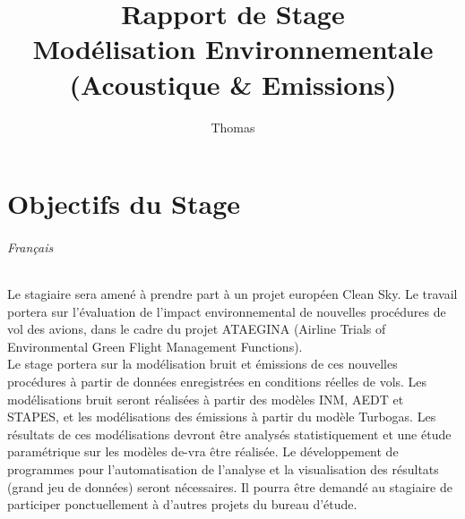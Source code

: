 \documentclass[a4paper]{article}
\begin{document}
    \title{
        Rapport de Stage\\
        Modélisation Environnementale\\
        (Acoustique \& Emissions)
        }
    \author{Thomas }
    \maketitle
    \vfill
    \tableofcontents
    \newpage
    
    \part{Objectifs du Stage}
    \paragraph{Français}
    Le stagiaire sera amené à prendre part à un projet européen Clean Sky. Le travail portera sur l'évaluation de l'impact environnemental de nouvelles procédures de vol des avions, dans le cadre du projet ATAEGINA (Airline Trials of Environmental Green Flight Management Functions).\\
    Le stage portera sur la modélisation bruit et émissions de ces nouvelles procédures à partir de données enregistrées en conditions réelles de vols. Les modélisations bruit seront réalisées à partir des modèles INM, AEDT et STAPES, et les modélisations des émissions à partir du modèle Turbogas. Les résultats de ces modélisations devront être analysés statistiquement et une étude paramétrique sur les modèles de-vra être réalisée. Le développement de programmes pour l'automatisation de l'analyse et la visualisation des résultats (grand jeu de données) seront nécessaires. Il pourra être demandé au stagiaire de participer ponctuellement à d'autres projets du bureau d'étude.
\end{document}
